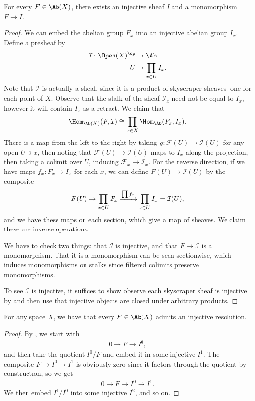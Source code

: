 \documentclass[11pt]{book}
\begin{document}
\begin{proposition}\label{prop:abX-enough-injectives} 
For every $F \in \Ab(X)$, there exists an injective sheaf $I$ and a monomorphism $F \to I$.
\end{proposition}
\begin{proof} We can embed the abelian group $F_x$ into an injective abelian group $I_x$. Define a presheaf by
\begin{align*}
    \mathcal{I} \colon \Open(X)^\op &\to \Ab \\
    U &\mapsto \prod_{x\in U}I_x.
\end{align*}
Note that $\mathcal{I}$ is actually a sheaf, since it is a product of skyscraper sheaves, one for each point of $X$. Observe that the stalk of the sheaf $\mathcal{I}_x$ need not be equal to $I_x$, however it will contain $I_x$ as a retract. We claim that
\begin{align*}
    \Hom_{\Ab(X)}(F,\mathcal{I}) \cong \prod_{x\in X}\Hom_\Ab(F_x,I_x).
\end{align*}
There is a map from the left to the right by taking $g \colon \mathcal{F}(U) \to \mathcal{I}(U)$ for any open $U\ni x$, then noting that $\mathcal{F}(U) \to \mathcal{I}(U)$ maps to $I_x$ along the projection, then taking a colimit over $U$, inducing $\mathcal{F}_x \to \mathcal{I}_x$. For the reverse direction, if we have maps $f_x \colon F_x \to I_x$ for each $x$, we can define $F(U) \to \mathcal{I}(U)$ by the composite
\begin{align*}
    F(U) \to \prod_{x\in U} F_x \xrightarrow{\prod f_x} \prod_{x\in U} I_x = \mathcal{I}(U),
\end{align*}
and we have these maps on each section, which give a map of sheaves. We claim these are inverse operations.

We have to check two things: that $\mathcal{I}$ is injective, and that $F \to \mathcal{I}$ is a monomorphism. That it is a monomorphism can be seen sectionwise, which induces monomorphisms on stalks since filtered colimits preserve monomorphisms.

To see $\mathcal{I}$ is injective, it suffices to show observe each skyscraper sheaf is injective by  and then use that injective objects are closed under arbitrary products.
\end{proof}

\begin{corollary} For any space $X$, we have that every $F\in\Ab(X)$ admits an injective resolution.
\end{corollary}
\begin{proof} By , we start with
\begin{align*}
    0 \to F \to I^0,
\end{align*}
and then take the quotient $I^0/F$ and embed it in some injective $I^1$. The composite $F \to I^0 \to I^1$ is obviously zero since it factors through the quotient by construction, so we get
\begin{align*}
    0 \to F \to I^0 \to I^1.
\end{align*}
We then embed $I^1/I^0$ into some injective $I^2$, and so on.
\end{proof}
\end{document}
